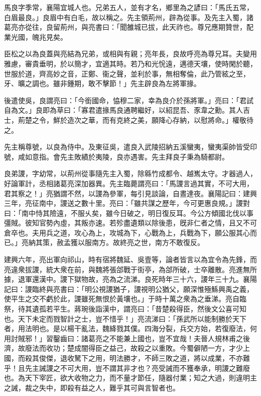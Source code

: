 
\begin{pinyinscope}
馬良字季常，襄陽宜城人也。兄弟五人，並有才名，鄉里為之諺曰：「馬氏五常，白眉最良。」良眉中有白毛，故以稱之。先主領荊州，辟為從事。及先主入蜀，諸葛亮亦從往，良留荊州，與亮書曰：「聞雒城已拔，此天祚也。尊兄應期贊世，配業光國，魄兆見矣。

臣松之以為良蓋與亮結為兄弟，或相與有親；亮年長，良故呼亮為尊兄耳。夫變用雅慮，審貴垂明，於以簡才，宜適其時。若乃和光恱遠，邁德天壤，使時閑於聽，世服於道，齊高妙之音，正鄭、衞之聲，並利於事，無相奪倫，此乃管絃之至，牙、曠之調也。雖非鍾期，敢不擊節！」先主辟良為左將軍掾。

後遣使吳，良謂亮曰：「今銜國命，恊穆二家，幸為良介於孫將軍。」亮曰：「君試自為文。」良即為草曰：「寡君遣掾馬良通聘繼好，以紹昆吾、豕韋之勳。其人吉士，荊楚之令，鮮於造次之華，而有克終之美，願降心存納，以慰將命。」權敬待之。

先主稱尊號，以良為侍中。及東征吳，遣良入武陵招納五溪蠻夷，蠻夷渠帥皆受印號，咸如意指。會先主敗績於夷陵，良亦遇害。先主拜良子秉為騎都尉。

良弟謖，字幼常，以荊州從事隨先主入蜀，除緜竹成都令、越嶲太守。才器過人，好論軍計，丞相諸葛亮深加器異。先主臨薨謂亮曰：「馬謖言過其實，不可大用，君其察之！」亮猶謂不然，以謖為參軍，每引見談論，自晝達夜。襄陽記曰：建興三年，亮征南中，謖送之數十里。亮曰：「雖共謀之歷年，今可更惠良規。」謖對曰：「南中恃其險遠，不服乆矣，雖今日破之，明日復反耳。今公方傾國北伐以事彊賊。彼知官勢內虛，其叛亦速。若殄盡遺類以除後患，旣非仁者之情，且又不可倉卒也。夫用兵之道，攻心為上，攻城為下，心戰為上，兵戰為下，願公服其心而已。」亮納其策，赦孟獲以服南方。故終亮之世，南方不敢復反。

建興六年，亮出軍向祁山，時有宿將魏延、吳壹等，論者皆言以為宜令為先鋒，而亮違衆拔謖，統大衆在前，與魏將張郃戰于街亭，為郃所破，士卒離散。亮進無所據，退軍還漢中。謖下獄物故，亮為之流涕。良死時年三十六，謖年三十九。襄陽記曰：謖臨終與亮書曰：「明公視謖猶子，謖視明公猶父，願深惟殛鯀興禹之義，使平生之交不虧於此，謖雖死無恨於黃壤也。」于時十萬之衆為之垂涕。亮自臨祭，待其遺孤若平生。蔣琬後詣漢中，謂亮曰：「昔楚殺得臣，然後文公喜可知也。天下未定而戮智計之士，豈不惜乎！」亮流涕曰：「孫武所以能制勝於天下者，用法明也。是以楊干亂法，魏絳戮其僕。四海分裂，兵交方始，若復廢法，何用討賊邪！」習鑿齒曰：諸葛亮之不能兼上國也，豈不宜哉！夫晉人規林甫之後濟，故廢法而收功；楚成闇得臣之益己，故殺之以重敗。今蜀僻陋一方，才少上國，而殺其俊傑，退收駑下之用，明法勝才，不師三敗之道，將以成業，不亦難乎！且先主誡謖之不可大用，豈不謂其非才也？亮受誡而不獲奉承，明謖之難廢也。為天下宰匠，欲大收物之力，而不量才節任，隨器付業；知之大過，則違明主之誡，裁之失中，即殺有益之人，難乎其可與言智者也。


\end{pinyinscope}